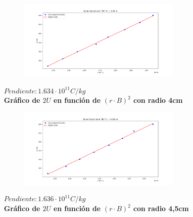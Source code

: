\documentclass[a4paper]{article}
\begin{document}
    \begin{figure}[h!]
        \centering
        \vspace{-2mm}
        \includegraphics[width = 8cm] {../imagenes/radio4.png}
        \vspace{-5mm}
    \end{figure}

    \begin{center}
        \textbf{$Pendiente: 1.634 \cdot 10^{11} C/kg$} \\
        \textbf{Gráfico de $2U$ en función de $(r \cdot B)^2$ con radio 4cm} \\
    \end{center}

    \begin{figure}[h!]
        \vspace{-2mm}
        \centering
        \includegraphics[width = 8cm] {../imagenes/radio4,5.png}
        \vspace{-5mm}
    \end{figure}

    \begin{center}
        \textbf{$Pendiente: 1.636 \cdot 10^{11} C/kg$} \\
        \textbf{Gráfico de $2U$ en función de $(r \cdot B)^2$ con radio 4,5cm} \\
    \end{center}
\end{document}
